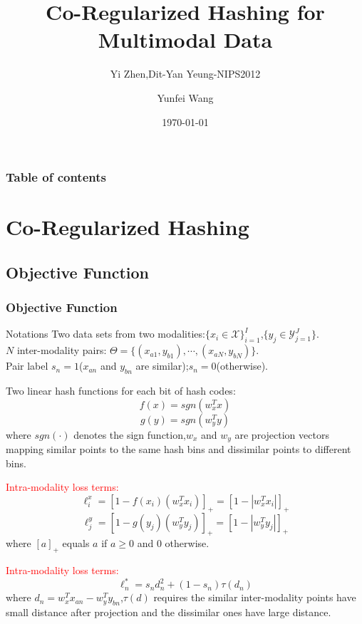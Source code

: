 \documentclass{beamer}
\title{Co-Regularized Hashing for Multimodal Data}
\subtitle{Yi Zhen,Dit-Yan Yeung-NIPS2012}
\author{Yunfei Wang}
\institute{Department of Computer Science \& Technology \\ Huazhong University of Science \& Technology}
\date{\today}
\begin{document}
\begin{CJK*}{UTF8}{gbsn} %

\begin{frame}
\titlepage
\end{frame}


\begin{frame}\frametitle{Table of contents}
\tableofcontents
\end{frame}

\section{Co-Regularized Hashing}
\subsection{Objective Function}
\begin{frame}[allowframebreaks]\frametitle{Objective Function}
\begin{block}{Notations}
Two data sets from two modalities:$\{x_i\in\mathcal{X}\}_{i=1}^I$,$\{y_j\in\mathcal{Y}_{j=1}^J\}$.\\
$N$ inter-modality pairs: $\Theta=\{(x_{a1},y_{b1}),\cdots,(x_{aN},y_{bN})\}$.\\
Pair label $s_n=1$($x_{an}$ and $y_{bn}$ are similar);$s_n=0$(otherwise).
\end{block}
Two linear hash functions for each bit of hash codes:
\begin{displaymath}
f(x)=sgn(w_x^Tx)
\end{displaymath}
\begin{displaymath}
g(y)=sgn(w_y^Ty)
\end{displaymath}
where $sgn(\cdot)$ denotes the sign function,$w_x$ and $w_y$ are projection vectors mapping similar points to the same hash bins and dissimilar points to different bins.

\textcolor{red}{Intra-modality loss terms:}
\begin{displaymath}
\ell_i^x=[1-f(x_i)(w_x^Tx_i)]_+=[1-|w_x^Tx_i|]_+
\end{displaymath}
\begin{displaymath}
\ell_j^y=[1-g(y_j)(w_y^Ty_j)]_+=[1-|w_y^Ty_j|]_+
\end{displaymath}
where $[a]_+$ equals $a$ if $a\geq 0$ and $0$ otherwise.

\textcolor{red}{Intra-modality loss terms:}
\begin{displaymath}
\ell_n^\ast =s_nd_n^2+(1-s_n)\tau(d_n)
\end{displaymath}
where $d_n=w_x^Tx_{an}-w_y^Ty_{bn}$,$\tau(d)$ requires the similar inter-modality points have small distance after projection and the dissimilar ones have large distance.


\end{frame}
\end{CJK*}
\end{document}
